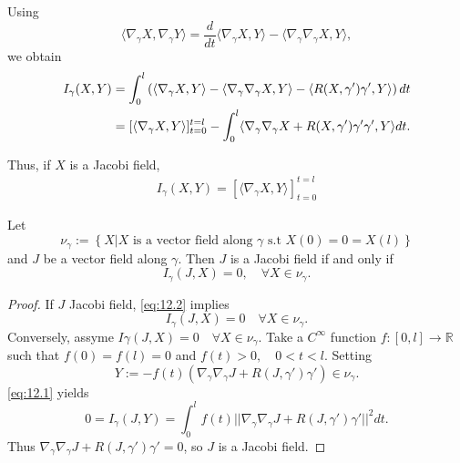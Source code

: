 Using
\[
\langle\nabla_{\gamma}X,\nabla_{\gamma}Y\rangle = \frac{d}{dt}\langle\nabla_{\gamma}X,Y\rangle - \langle\nabla_{\gamma}\nabla_{\gamma}X, Y\rangle,
\]
we obtain
\begin{align}\label{eq:12.1}
I_{\gamma}(X,Y) &= \int_0^l\left(\langle \nabla_{\gamma}X,Y\rangle - \langle\nabla_{\gamma}\nabla_{\gamma}X,Y\rangle - \langle R(X,\gamma')\gamma',Y\rangle\right)dt \notag \\
&= [\langle \nabla_{\gamma}X,Y\rangle]_{t=0}^{t=l} - \int_0^l\langle\nabla_{\gamma}\nabla_{\gamma}X + R(X,\gamma')\gamma'\gamma',Y\rangle dt.
\end{align}

Thus, if $X$ is a Jacobi field,
\begin{align}\label{eq:12.2}
I_{\gamma}(X,Y) = [\langle\nabla_{\gamma}X,Y\rangle]_{t=0}^{t=l}
\end{align}

\begin{proposition}
Let
\[
\nu_{\gamma} := \left\{X|X \text{ is a vector field along } \gamma \text{ s.t } X(0) = 0 = X(l)\right\}
\]
and $J$ be a vector field along $\gamma$. Then $J$ is a Jacobi field
if and only if
\[
I_{\gamma}(J,X) = 0, \quad \forall X \in \nu_{\gamma}.
\]
\end{proposition}

\begin{proof}
If $J$ Jacobi field, \eqref{eq:12.2} implies
\[
I_{\gamma}(J,X) = 0 \quad \forall X \in \nu_{\gamma}.
\]
Conversely, assyme $I{\gamma}(J,X) = 0\quad \forall X \in \nu_{\gamma}$.
Take a $C^{\infty}$ function $f:[0,l] \to \mathbb{R}$ such that $f(0) = f(l) = 0$ and $f(t) > 0, \quad 0< t < l$. Setting
\[
Y := -f(t) (\nabla_{\gamma}\nabla_{\gamma}J + R(J,\gamma')\gamma') \in \nu_{\gamma}.
\]
\eqref{eq:12.1} yields
\[
0 = I_{\gamma}(J,Y) = \int_0^l f(t) ||\nabla_{\gamma}\nabla_{\gamma}J + R(J,\gamma')\gamma'||^2 dt.
\]
Thus $\nabla_{\gamma}\nabla_{\gamma}J + R(J,\gamma')\gamma' = 0$, so $J$ is a Jacobi field.
\end{proof}